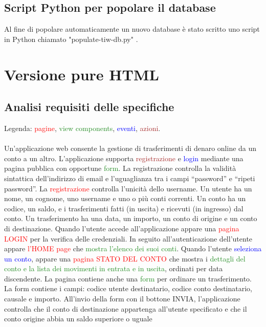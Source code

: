 \documentclass{article}
\begin{document}
\subsection{Script Python per popolare il database}
Al fine di popolare automaticamente un nuovo database è stato scritto uno script in Python chiamato "populate-tiw-db.py" .
\pagebreak

\section{Versione pure HTML}

\subsection{Analisi requisiti delle specifiche}
Legenda: \textcolor{red}{pagine}, \textcolor{ForestGreen}{view components}, \textcolor{blue}{eventi}, \textcolor{brown}{azioni}.
\\
\\
Un’applicazione web consente la gestione di trasferimenti di denaro online da un conto a un
altro. L’applicazione supporta  \textcolor{brown}{registrazione} e  \textcolor{blue}{login} mediante una pagina pubblica con
opportune  \textcolor{ForestGreen}{form}. La registrazione controlla la validità sintattica dell’indirizzo di email e
l’uguaglianza tra i campi “password” e “ripeti password”. La \textcolor{red}{registrazione} controlla l’unicità
dello username. Un utente ha un nome, un cognome, uno username e uno o più conti correnti.
Un conto ha un codice, un saldo, e i trasferimenti fatti (in uscita) e ricevuti (in ingresso) dal
conto. Un trasferimento ha una data, un importo, un conto di origine e un conto di destinazione.
Quando l’utente accede all’applicazione appare una  \textcolor{red}{pagina LOGIN} per la verifica delle
credenziali. In seguito all’autenticazione dell’utente appare \textcolor{red}{l’HOME page} che \textcolor{ForestGreen}{mostra l’elenco
dei suoi conti}. Quando l’utente  \textcolor{blue}{seleziona un conto}, appare una \textcolor{red}{pagina STATO DEL CONTO}
che mostra i \textcolor{ForestGreen}{dettagli del conto e la lista dei movimenti in entrata e in uscita}, ordinati per data
discendente. La pagina contiene anche una \textcolor{ForestGreen}{form} per ordinare un trasferimento. La form
contiene i campi: codice utente destinatario, codice conto destinatario, causale e importo.
All’invio della form con il bottone INVIA, l’applicazione controlla che il conto di destinazione
appartenga all’utente specificato e che il conto origine abbia un saldo superiore o uguale
\end{document}
